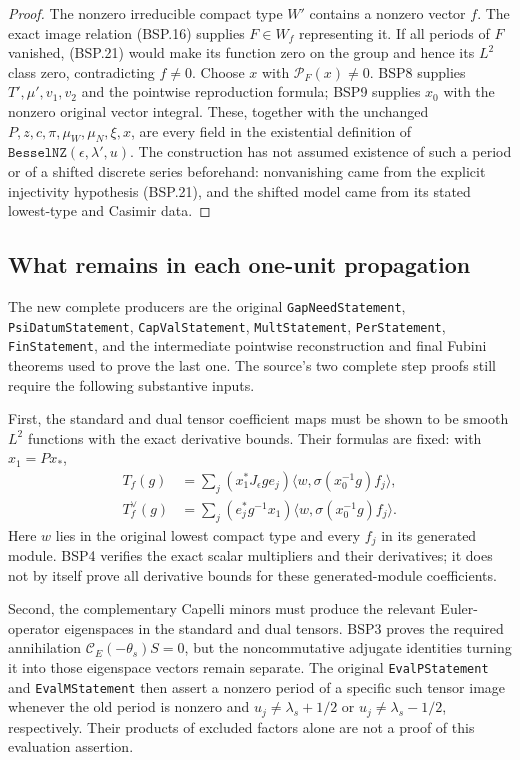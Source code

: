 \begin{proof}
The nonzero irreducible compact type $W'$ contains a nonzero vector
$f$.  The exact image relation (BSP.16) supplies $F\in W_f$ representing
it.  If all periods of $F$ vanished, (BSP.21) would make its function
zero on the group and hence its $L^2$ class zero, contradicting $f\ne0$.
Choose $x$ with $\mathcal P_F(x)\ne0$.
BSP8 supplies $T',\mu',v_1,v_2$ and the pointwise reproduction formula;
BSP9 supplies $x_0$ with the nonzero original vector integral.
These, together with the unchanged $P,z,c,\pi,\mu_W,\mu_N,\xi,x$,
are every field in the existential definition of
$\texttt{BesselNZ}(\epsilon,\lambda',u)$.
The construction has not assumed existence of such a period or of
a shifted discrete series beforehand: nonvanishing came from the
explicit injectivity hypothesis (BSP.21), and the shifted model came
from its stated lowest-type and Casimir data.
\end{proof}

\subsection{What remains in each one-unit propagation}

The new complete producers are the original
\texttt{GapNeedStatement}, \texttt{PsiDatumStatement},
\texttt{CapValStatement}, \texttt{MultStatement},
\texttt{PerStatement}, \texttt{FinStatement}, and the intermediate
pointwise reconstruction and final Fubini theorems used to prove the last
one.  The source's two complete step proofs still require the following
substantive inputs.

First, the standard and dual tensor coefficient maps must be shown to be
smooth $L^2$ functions with the exact derivative bounds.  Their formulas
are fixed: with $x_1=P x_*$,
\[
 \begin{split}
 T_f(g)&=\sum_j (x_1^*J_\epsilon g e_j)
                  \langle w,\sigma(x_0^{-1}g)f_j\rangle,\\
 T_f^\vee(g)&=\sum_j (e_j^*g^{-1}x_1)
                  \langle w,\sigma(x_0^{-1}g)f_j\rangle.
 \end{split}
 \tag{BSP.22}
\]
Here $w$ lies in the original lowest compact type and every $f_j$ in
its generated module.  BSP4 verifies the exact scalar multipliers and
their derivatives; it does not by itself prove all derivative bounds
for these generated-module coefficients.

Second, the complementary Capelli minors must produce the relevant
Euler-operator eigenspaces in the standard and dual tensors.
BSP3 proves the required annihilation
$\mathcal C_E(-\theta_s)S=0$, but the noncommutative adjugate identities
turning it into those eigenspace vectors remain separate.
The original \texttt{EvalPStatement} and \texttt{EvalMStatement} then
assert a nonzero period of a specific such tensor image whenever
the old period is nonzero and
$u_j\ne\lambda_s+1/2$ or $u_j\ne\lambda_s-1/2$, respectively.
Their products of excluded factors alone are not a proof of this
evaluation assertion.

